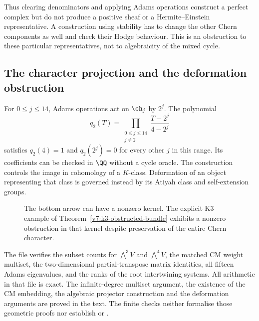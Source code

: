 Thus clearing denominators and applying Adams operations construct
a perfect complex but do not produce a positive sheaf or a
Hermite--Einstein representative. A construction using stability has
to change the other Chern components as well and check their Hodge
behaviour. This is an obstruction to these particular representatives,
not to algebraicity of the mixed cycle.

\subsection{The character projection and the deformation obstruction}

For $0\le j\le14$, Adams operations act on $\ch_j$ by $2^j$.
The polynomial
\[
 q_2(T)=\prod_{\substack{0\le j\le14\\j\ne2}}
        \frac{T-2^j}{4-2^j}
\]
satisfies $q_2(4)=1$ and $q_2(2^j)=0$ for every other $j$ in this
range. Its coefficients can be checked in $\QQ$ without a cycle
oracle. The construction controls the image in cohomology of a
$K$-class. Deformation of an object representing that class is
governed instead by its Atiyah class and self-extension groups.

\begin{figure}[htbp]
\centering
{}
\caption{The bottom arrow can have a nonzero kernel. The explicit K3
example of Theorem~\ref{v7:k3-obstructed-bundle} exhibits a
nonzero obstruction in that kernel despite preservation of the
entire Chern character.}\label{v7:fig:obstruction}
\end{figure}

The file  verifies the subset counts
for $\bigwedge^3V$ and $\bigwedge^4V$, the matched CM weight
multiset, the two-dimensional partial-transpose matrix identities,
all fifteen Adams eigenvalues, and the ranks of the root
intertwining systems. All arithmetic in that file is exact.
The infinite-degree multiset argument, the existence of the CM
embedding, the algebraic projector construction and the deformation
arguments are proved in the text. The finite checks neither
formalise those geometric proofs nor establish \Fii{} or \Fiii{}.
